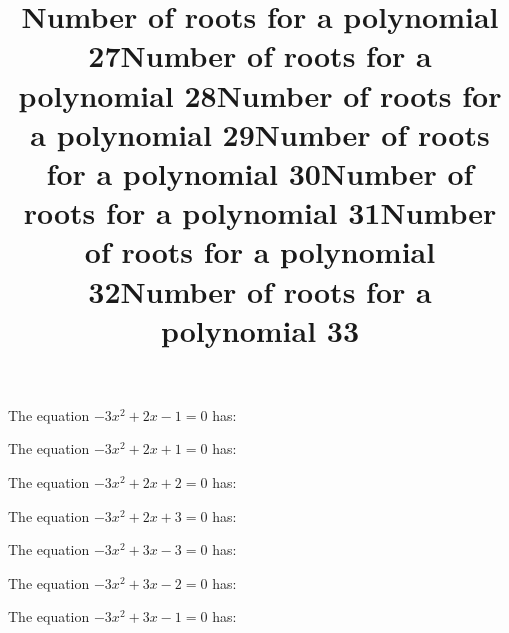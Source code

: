 \documentclass{article}
\begin{document}
\begin{category}
\begin{question}[multichoice]
\end{question}
\begin{question}[multichoice]
\title{Number of roots for a polynomial 27}
The equation $- 3 x^{2} + 2 x - 1=0$ has:



\end{question}
\begin{question}[multichoice]
\title{Number of roots for a polynomial 28}
The equation $- 3 x^{2} + 2 x + 1=0$ has:



\end{question}
\begin{question}[multichoice]
\title{Number of roots for a polynomial 29}
The equation $- 3 x^{2} + 2 x + 2=0$ has:



\end{question}
\begin{question}[multichoice]
\title{Number of roots for a polynomial 30}
The equation $- 3 x^{2} + 2 x + 3=0$ has:



\end{question}
\begin{question}[multichoice]
\title{Number of roots for a polynomial 31}
The equation $- 3 x^{2} + 3 x - 3=0$ has:



\end{question}
\begin{question}[multichoice]
\title{Number of roots for a polynomial 32}
The equation $- 3 x^{2} + 3 x - 2=0$ has:



\end{question}
\begin{question}[multichoice]
\title{Number of roots for a polynomial 33}
The equation $- 3 x^{2} + 3 x - 1=0$ has:


\end{question}
\end{category}
\end{document}
